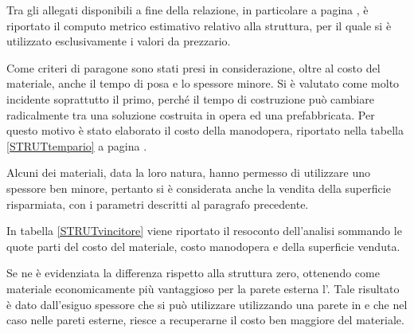 Tra gli allegati disponibili a fine della relazione, in particolare a pagina \pageref{STRUTcostoMateriale}, è riportato il computo metrico estimativo relativo alla struttura, per il quale si è utilizzato esclusivamente i valori da prezzario.

Come criteri di paragone sono stati presi in considerazione, oltre al costo del materiale, anche il tempo di posa e lo spessore minore. 
Si è valutato come molto incidente soprattutto il primo, perché il tempo di costruzione può cambiare radicalmente tra una soluzione costruita in opera ed una prefabbricata.
Per questo motivo è stato elaborato il costo della manodopera, riportato nella tabella \ref{STRUTtempario} a pagina \pageref{STRUTtempario}. 

Alcuni dei materiali, data la loro natura, hanno permesso di utilizzare uno spessore ben minore, pertanto si è considerata anche la vendita della superficie risparmiata, con i parametri descritti al paragrafo precedente.

In tabella \ref{STRUTvincitore} viene riportato il resoconto dell'analisi sommando le quote parti del costo del materiale, costo manodopera e della superficie venduta.

Se ne è evidenziata la differenza rispetto alla struttura zero, ottenendo come materiale economicamente più vantaggioso per la parete esterna l'\xlam.
Tale risultato è dato dall'esiguo spessore che si può utilizzare utilizzando una parete in \xlam{} e che nel caso nelle pareti esterne, riesce a recuperarne il costo ben maggiore del materiale.

